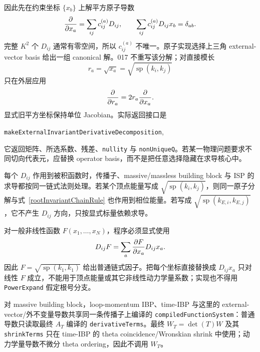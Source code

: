 ﻿\documentclass[a4paper,11pt]{article}
\begin{document}
因此先在约束坐标 $\{x_b\}$ 上解平方原子导数
\begin{equation}
  {\partial\over\partial x_a}
  =
  \sum_{ij}c^{(a)}_{ij}D_{ij},
  \qquad
  \sum_{ij}c^{(a)}_{ij}D_{ij}x_b=\delta_{ab}.
  \label{externalInvariantDecomposition}
\end{equation}
完整 $K^2$ 个 $D_{ij}$ 通常有零空间，所以 $c^{(a)}_{ij}$ 不唯一。原子实现选择上三角 external-vector basis 给出一组 canonical 解。017 不重写该分解；对直接模长
\begin{equation}
  r_a=\sqrt{x_a}=\sqrt{\operatorname{sp}(k_i,k_j)}
\end{equation}
只在外层应用
\begin{equation}
  {\partial\over\partial r_a}=2r_a{\partial\over\partial x_a}.
  \label{rootInvariantChainRule}
\end{equation}
显式旧平方坐标保持单位 Jacobian。实际返回接口是
\begin{center}
  \texttt{makeExternalInvariantDerivativeDecomposition},
\end{center}
它返回矩阵、所选系数、残差、\verb|nullity| 与 \verb|nonUniqueQ|。若某一物理问题要求不同切向代表元，应替换 operator basis，而不是把任意选择隐藏在求导核心中。

每个 $D_{ij}$ 作用到被积函数时，传播子、massive/massless building block 与 ISP 的求导都按同一链式法则处理。若某个顶点能量写成 $\sqrt{\operatorname{sp}(k_i,k_j)}$，则同一原子分解与式~\eqref{rootInvariantChainRule} 也作用到相位能量。若写成 $\sqrt{\operatorname{sp}(k_{E,i},k_{E,j})}$，它不产生 $D_{ij}$ 方向，只按显式标量依赖求导。

对一般非线性函数 $F(x_1,\ldots,x_N)$，程序必须显式使用
\begin{equation}
  D_{ij}F
  =\sum_a {\partial F\over\partial x_a}D_{ij}x_a.
  \label{externalVectorFunctionChainRule}
\end{equation}
因此 $F=\sqrt{\operatorname{sp}(k_1,k_1)}$ 给出普通链式因子。把每个坐标直接替换成 $D_{ij}x_a$ 只对线性 $F$ 成立，不能用于顶点能量或其它非线性动力学量系数；实现也不得用 \texttt{PowerExpand} 假定根号分支。

对 massive building block，loop-momentum IBP、time-IBP 与这里的 external-vector/外不变量导数共享同一条传播子上编译的 \texttt{compiledFunction\allowbreak System}：普通导数只读取最终 $A_T$ 编译的 \texttt{derivative\allowbreak Terms}。最终 $W_T=\det(T)W$ 及其 \texttt{shrink\allowbreak Terms} 只在 time-IBP 的 theta coincidence/Wronskian shrink 中使用；动力学量导数不微分 theta ordering，因此不调用 $W_T$。
\end{document}
